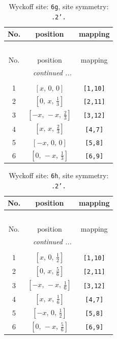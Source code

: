 \documentclass[fleqn,8pt]{jsarticle}
\begin{document}
\renewcommand{\arraystretch}{1.2}
\begin{longtable}{ccc}
\caption{Wyckoff site: {\tt 6g}, site symmetry: {\tt .2'.}}
 \\
 \hline \hline
No. & position & mapping \\ \hline \endfirsthead

\multicolumn{2}{l}{\tablename\ \thetable{}} \\
 \hline \hline
No. & position & mapping \\ \hline \endhead

 \hline \hline
\multicolumn{2}{r}{\footnotesize\it continued ...} \\ \endfoot

 \hline \hline
\multicolumn{2}{r}{} \\ \endlastfoot

1 & $\left[ x,\, 0,\, 0 \right]$ & {\tt [1,10]} \\ \hline
2 & $\left[ 0,\, x,\, \frac{1}{3} \right]$ & {\tt [2,11]} \\ \hline
3 & $\left[ - x,\, - x,\, \frac{2}{3} \right]$ & {\tt [3,12]} \\ \hline
4 & $\left[ x,\, x,\, \frac{2}{3} \right]$ & {\tt [4,7]} \\ \hline
5 & $\left[ - x,\, 0,\, 0 \right]$ & {\tt [5,8]} \\ \hline
6 & $\left[ 0,\, - x,\, \frac{1}{3} \right]$ & {\tt [6,9]} \\
\end{longtable}
\renewcommand{\arraystretch}{1.2}
\begin{longtable}{ccc}
\caption{Wyckoff site: {\tt 6h}, site symmetry: {\tt .2'.}}
 \\
 \hline \hline
No. & position & mapping \\ \hline \endfirsthead

\multicolumn{2}{l}{\tablename\ \thetable{}} \\
 \hline \hline
No. & position & mapping \\ \hline \endhead

 \hline \hline
\multicolumn{2}{r}{\footnotesize\it continued ...} \\ \endfoot

 \hline \hline
\multicolumn{2}{r}{} \\ \endlastfoot

1 & $\left[ x,\, 0,\, \frac{1}{2} \right]$ & {\tt [1,10]} \\ \hline
2 & $\left[ 0,\, x,\, \frac{5}{6} \right]$ & {\tt [2,11]} \\ \hline
3 & $\left[ - x,\, - x,\, \frac{1}{6} \right]$ & {\tt [3,12]} \\ \hline
4 & $\left[ x,\, x,\, \frac{1}{6} \right]$ & {\tt [4,7]} \\ \hline
5 & $\left[ - x,\, 0,\, \frac{1}{2} \right]$ & {\tt [5,8]} \\ \hline
6 & $\left[ 0,\, - x,\, \frac{5}{6} \right]$ & {\tt [6,9]} \\
\end{longtable}
\end{document}
